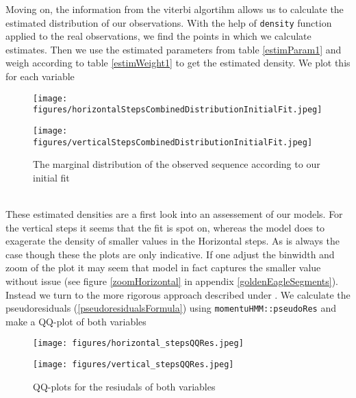 Moving on, the information from the viterbi algortihm allows us to calculate the estimated distribution of our observations. With the help of \texttt{density} function \cite{RLang} applied to the real observations, we find the points in which we calculate estimates. Then we use the estimated parameters from table \ref{estimParam1} and weigh according to table \ref{estimWeight1} to get the estimated density. We plot this for each variable
\begin{figure}[h]
    \centering
    \begin{minipage}[b]{0.49\textwidth}
      \texttt{[image: figures/horizontalStepsCombinedDistributionInitialFit.jpeg]}
    \end{minipage}
    \hfill
    \begin{minipage}[b]{0.49\textwidth}
      \texttt{[image: figures/verticalStepsCombinedDistributionInitialFit.jpeg]}
    \end{minipage}
    \caption{The marginal distribution of the observed sequence according to our initial fit}
    \label{combinedDensityPlotsInitialFit}
\end{figure}\\
These estimated densities are a first look into an assessement of our models. For the vertical steps it seems that the fit is spot on, whereas the model does to exagerate the density of smaller values in the Horizontal steps. As is always the case though these the plots are only indicative. If one adjust the binwidth and zoom of the plot it may seem that model in fact captures the smaller value without issue (see figure \ref{zoomHorizontal} in appendix \ref{goldenEagleSegments}). Instead we turn to the more rigorous approach described under . We calculate the pseudoresiduals (\ref{pseudoresidualsFormula}) using \texttt{momentuHMM::pseudoRes} and make a QQ-plot of both variables
\begin{figure}[h]
    \centering
    \begin{minipage}[b]{0.49\textwidth}
      \texttt{[image: figures/horizontal\_stepsQQRes.jpeg]}
    \end{minipage}
    \hfill
    \begin{minipage}[b]{0.49\textwidth}
      \texttt{[image: figures/vertical\_stepsQQRes.jpeg]}
    \end{minipage}
    \caption{QQ-plots for the resiudals of both variables}
    \label{combinedQQPlots}
\end{figure}\\
